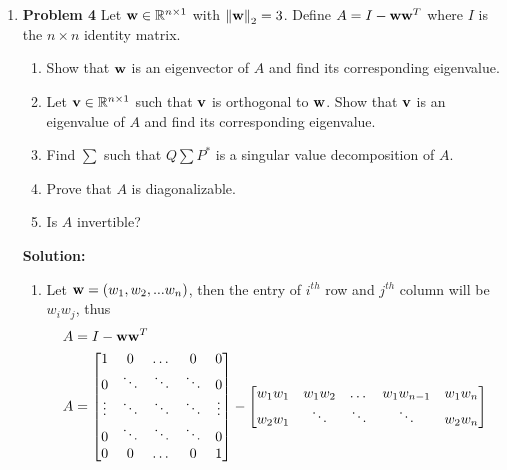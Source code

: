 \documentclass{uofa-eng-assignment}
\begin{document}
\begin{enumerate}
	\item[] \textbf{Problem 4} \newline
	      Let $\vb{w} \in \mathbb{R}^{n\times 1}$   with $\norm{\vb{w}}_2 = 3$. Define $A = I - \vb{w}\vb{w}^T$ where $I$ is the $n\times n$ identity matrix.
	      \begin{enumerate}
	      	\item Show that $\vb{w}$ is an eigenvector of $A$ and find its corresponding eigenvalue.
	      	\item Let $\vb{v} \in \mathbb{R}^{n\times 1}$ such that $\vb{v}$ is orthogonal to $\vb{w}$. Show that $\vb{v}$ is an eigenvalue of $A$ and find its corresponding eigenvalue.
	      	\item Find $\sum$ such that $Q\sum P^*$ is a singular value decomposition of $A$.
	      	\item Prove that $A$ is diagonalizable.
	      	\item Is $A$ invertible?
	      \end{enumerate}
	      \textbf{Solution:} \\
	      \begin{enumerate}
	      	\item Let $\vb{w} = (w_1, w_2, ... w_n)$, then the entry of $i^{th}$ row  and  $j^{th}$ column will be $w_i w_j$, thus
	      	      \begin{align*}
	      	      	A &= I - \vb{w} \vb{w}^T \\
	      	      	A &= \begin{bmatrix}
	      	      	1           & 0        & \dots  & 0            & 0           \\
	      	      	0           & \ddots   & \ddots & \ddots       & 0           \\
	      	      	\vdots      & \ddots   & \ddots & \ddots       & \vdots      \\
	      	      	0           & \ddots   & \ddots & \ddots       & 0           \\
	      	      	0           & 0        & \dots  & 0            & 1           
	      	      	\end{bmatrix} -
	      	      	\begin{bmatrix}
	      	      	w_1 w_1     & w_1w_2   & \dots  & w_1 w_{n-1}  & w_1 w_n     \\
	      	      	w_2w_1      & \ddots   & \ddots & \ddots       & w_2 w_n     \\

\end{bmatrix}
\end{align*}
\end{enumerate}
\end{enumerate}
\end{document}
